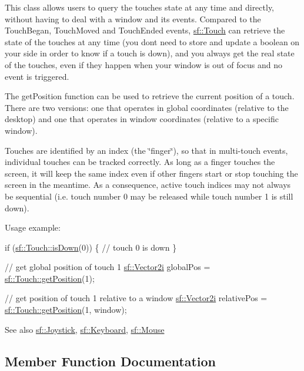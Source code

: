 This class allows users to query the touches state at any time and directly, without having to deal with a window and its events. Compared to the Touch\+Began, Touch\+Moved and Touch\+Ended events, \hyperlink{classsf_1_1_touch}{sf\+::\+Touch} can retrieve the state of the touches at any time (you don\textquotesingle{}t need to store and update a boolean on your side in order to know if a touch is down), and you always get the real state of the touches, even if they happen when your window is out of focus and no event is triggered.

The get\+Position function can be used to retrieve the current position of a touch. There are two versions\+: one that operates in global coordinates (relative to the desktop) and one that operates in window coordinates (relative to a specific window).

Touches are identified by an index (the \char`\"{}finger\char`\"{}), so that in multi-\/touch events, individual touches can be tracked correctly. As long as a finger touches the screen, it will keep the same index even if other fingers start or stop touching the screen in the meantime. As a consequence, active touch indices may not always be sequential (i.\+e. touch number 0 may be released while touch number 1 is still down).

Usage example\+: 
\begin{DoxyCode}
\textcolor{keywordflow}{if} (\hyperlink{classsf_1_1_touch_a2f85297123ea4e401d02c346e50d48a3}{sf::Touch::isDown}(0))
\{
    \textcolor{comment}{// touch 0 is down}
\}

\textcolor{comment}{// get global position of touch 1}
\hyperlink{classsf_1_1_vector2}{sf::Vector2i} globalPos = \hyperlink{classsf_1_1_touch_af1b7035be709091c7475075e43e2bc23}{sf::Touch::getPosition}(1);

\textcolor{comment}{// get position of touch 1 relative to a window}
\hyperlink{classsf_1_1_vector2}{sf::Vector2i} relativePos = \hyperlink{classsf_1_1_touch_af1b7035be709091c7475075e43e2bc23}{sf::Touch::getPosition}(1, window);
\end{DoxyCode}


\begin{DoxySeeAlso}{See also}
\hyperlink{classsf_1_1_joystick}{sf\+::\+Joystick}, \hyperlink{classsf_1_1_keyboard}{sf\+::\+Keyboard}, \hyperlink{classsf_1_1_mouse}{sf\+::\+Mouse} 
\end{DoxySeeAlso}


\subsection{Member Function Documentation}
\mbox{\label{classsf_1_1_touch_af1b7035be709091c7475075e43e2bc23}} 
